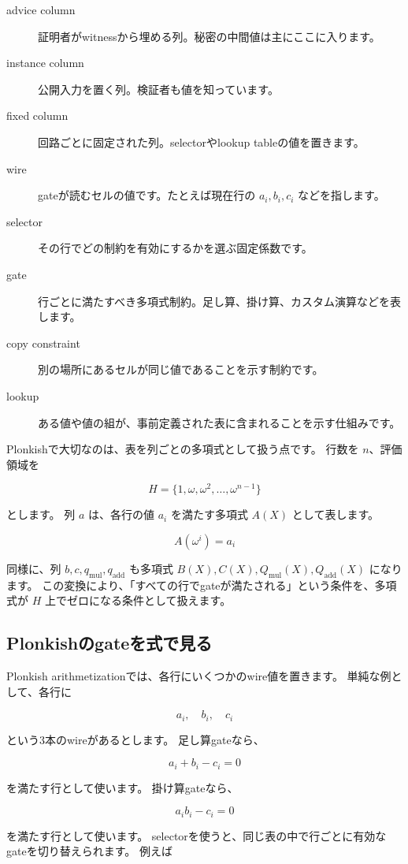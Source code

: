 \documentclass[a4paper,11pt]{ltjsarticle}
\begin{document}
\begin{description}
  \item[advice column] 証明者がwitnessから埋める列。秘密の中間値は主にここに入ります。
  \item[instance column] 公開入力を置く列。検証者も値を知っています。
  \item[fixed column] 回路ごとに固定された列。selectorやlookup tableの値を置きます。
  \item[wire] gateが読むセルの値です。たとえば現在行の \(a_i,b_i,c_i\) などを指します。
  \item[selector] その行でどの制約を有効にするかを選ぶ固定係数です。
  \item[gate] 行ごとに満たすべき多項式制約。足し算、掛け算、カスタム演算などを表します。
  \item[copy constraint] 別の場所にあるセルが同じ値であることを示す制約です。
  \item[lookup] ある値や値の組が、事前定義された表に含まれることを示す仕組みです。
\end{description}

Plonkishで大切なのは、表を列ごとの多項式として扱う点です。
行数を \(n\)、評価領域を

\[
  H=\{1,\omega,\omega^2,\ldots,\omega^{n-1}\}
\]

とします。
列 \(a\) は、各行の値 \(a_i\) を満たす多項式 \(A(X)\) として表します。

\[
  A(\omega^i)=a_i
\]

同様に、列 \(b,c,q_{\mathrm{mul}},q_{\mathrm{add}}\) も多項式 \(B(X),C(X),Q_{\mathrm{mul}}(X),Q_{\mathrm{add}}(X)\) になります。
この変換により、「すべての行でgateが満たされる」という条件を、多項式が \(H\) 上でゼロになる条件として扱えます。

\subsection{Plonkishのgateを式で見る}

Plonkish arithmetizationでは、各行にいくつかのwire値を置きます。
単純な例として、各行に

\[
  a_i,\quad b_i,\quad c_i
\]

という3本のwireがあるとします。
足し算gateなら、

\[
  a_i+b_i-c_i=0
\]

を満たす行として使います。
掛け算gateなら、

\[
  a_i b_i-c_i=0
\]

を満たす行として使います。
selectorを使うと、同じ表の中で行ごとに有効なgateを切り替えられます。
例えば
\end{document}

